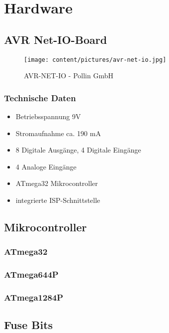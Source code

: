 \chapter{Hardware}
\section{AVR Net-IO-Board}
\begin{figure}[h]
\centering
\texttt{[image: content/pictures/avr-net-io.jpg]}
\caption{AVR-NET-IO - Pollin GmbH}
\label{fig:B3}
\end{figure}

\subsection{Technische Daten}
\begin{itemize}
  \item Betriebsspannung 9V
  \item Stromaufnahme ca. 190 mA
  \item 8 Digitale Ausgänge, 4 Digitale Eingänge
  \item 4 Analoge Eingänge
  \item ATmega32 Mikrocontroller
  \item integrierte ISP-Schnittstelle
\end{itemize}

\section{Mikrocontroller}
\subsection{ATmega32}

\subsection{ATmega644P}

\subsection{ATmega1284P}

\section{Fuse Bits}
\label{chap:Fuse}
